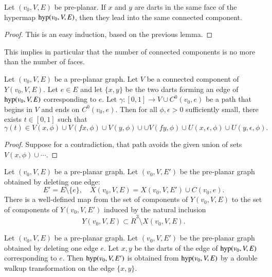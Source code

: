 \begin{lemma} Let $(v_0,V,E)$ be pre-planar.
If $x$ and $y$ are darts in the same face of the hypermap
${\operatorname{hyp}}(v_0,V,E)$, then they lead into the same connected component.
\end{lemma}

\begin{proof}  This is an easy induction, based on the previous
lemma.  
\end{proof}

This implies in particular
that the number of connected components is no more than
the number of faces.  


\begin{lemma}\label{lemma:approach-Ce}
Let $(v_0,V,E)$ be a pre-planar graph.  Let $V$ be a connected
component of $Y(v_0,V,E)$.  Let $e\in E$ and let $\{x,y\}$
be the two darts forming an edge of ${\operatorname{hyp}}(v_0,V,E)$
corresponding to $e$.  Let $\gamma:[0,1]\to V\cup C^0(v_0,e)$
be a path that begins in $V$ and ends on $C^0(v_0,e)$.
Then for all $\phi,\epsilon>0$ sufficiently small,
there exists  $t\in[0,1]$ such that
  $$\gamma(t)\in 
  V(x,\phi) \cup V(f x,\phi)\cup 
  V(y,\phi)\cup \cup V(f y,\phi) 
  \cup U(x,\epsilon,\phi)
  \cup U(y,\epsilon,\phi).
  $$
\end{lemma}

\begin{proof}
Suppose for a contradiction, that path avoids the given union
of sets $V(x,\phi)\cup\cdots$.  
\end{proof}

\begin{lemma}
Let $(v_0,V,E)$ be a pre-planar graph.  Let $(v_0,V,E')$
be the pre-planar graph obtained by deleting one edge:
  $$
  E' = E\setminus\{e\}, \quad X(v_0,V,E) = X(v_0,V,E')\cup C(v_0,e).
  $$
There is a well-defined map from the set of components
of $Y(v_0,V,E)$ to the set of components
of $Y(v_0,V,E')$ induced by the natural
inclusion
   $$Y(v_0,V,E) \subset \ring{R}^3
   \setminus X(v_0,V,E).
   $$
\end{lemma}

\begin{lemma}\label{lemma:pre-walkup}
Let $(v_0,V,E)$ be a pre-planar graph.  Let $(v_0,V,E')$
be the pre-planar graph obtained by deleting one edge $e$.
Let $x,y$ be the darts of the edge of
${\operatorname{hyp}}(v_0,V,E)$ corresponding
to $e$.
Then ${\operatorname{hyp}}(v_0,V,E')$ is obtained from ${\operatorname{hyp}}(v_0,V,E)$
by a double walkup transformation on the edge $\{x,y\}$.
\end{lemma}


